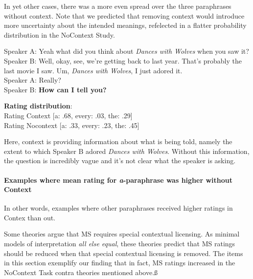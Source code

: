 \documentclass[12pt,letterpaper,table,svgnames,dvipsnames]{article}
\begin{document}
In yet other cases, there was a more even spread over the three paraphrases without context. Note that we predicted that removing context would introduce more uncertainty about the intended meanings, refelected in a flatter probability distribution in the NoContext Study. 
\begin{exe}
    \ex {}
    \begin{xlist}
    \ex {}
    Speaker A: Yeah what did you think about \emph{Dances with Wolves} when you saw it?\\
    Speaker B: Well, okay, see, we're getting back to last year. That's probably the last movie I saw. Um, \emph{Dances with Wolves}, I just adored it.\\
    Speaker A: Really?\\
    Speaker B: \textbf{How can I tell you?}
    
    \ex \textbf{Rating distribution}:\\
    Rating Context [a: .68, every: .03, the: .29]\\
    Rating Nocontext [a: .33, every: .23, the: .45] 
    \end{xlist}
\end{exe}
Here, context is providing information about what is being told, namely the extent to which Speaker B adored \emph{Dances with Wolves}. Without this information, the question is incredibly vague and it's not clear what the speaker is asking.



\paragraph{Examples where mean rating for \emph{a}-paraphrase was higher without Context} In other words, examples where other paraphrases received higher ratings in Contex than out.

Some theories argue that MS requires special contextual licensing. As minimal models of interpretation \emph{all else equal}, these theories predict that MS ratings should be reduced when that special contextual licensing is removed. The items in this section exemplify our finding that in fact, MS ratings increased in the NoContext Task contra theories mentioned above.ß
\end{document}
